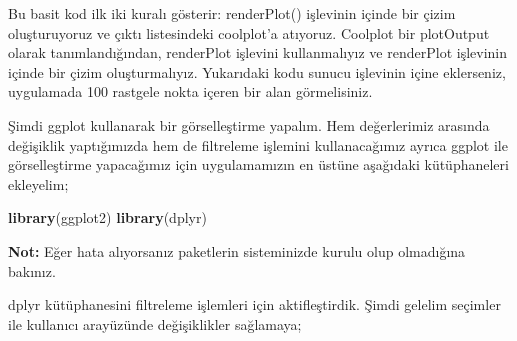 \documentclass[]{book}
\newenvironment{Shaded}{\begin{snugshade}}{\end{snugshade}}
\newcommand{\KeywordTok}[1]{\textcolor[rgb]{0.13,0.29,0.53}{\textbf{#1}}}
\newcommand{\DecValTok}[1]{\textcolor[rgb]{0.00,0.00,0.81}{#1}}
\newcommand{\StringTok}[1]{\textcolor[rgb]{0.31,0.60,0.02}{#1}}
\newcommand{\OperatorTok}[1]{\textcolor[rgb]{0.81,0.36,0.00}{\textbf{#1}}}
\newcommand{\ErrorTok}[1]{\textcolor[rgb]{0.64,0.00,0.00}{\textbf{#1}}}
\newcommand{\NormalTok}[1]{#1}
\begin{document}
Bu basit kod ilk iki kuralı gösterir: renderPlot() işlevinin içinde bir
çizim oluşturuyoruz ve çıktı listesindeki coolplot'a atıyoruz. Coolplot
bir plotOutput olarak tanımlandığından, renderPlot işlevini
kullanmalıyız ve renderPlot işlevinin içinde bir çizim oluşturmalıyız.
Yukarıdaki kodu sunucu işlevinin içine eklerseniz, uygulamada 100
rastgele nokta içeren bir alan görmelisiniz.

Şimdi ggplot kullanarak bir görselleştirme yapalım. Hem değerlerimiz
arasında değişiklik yaptığımızda hem de filtreleme işlemini
kullanacağımız ayrıca ggplot ile görselleştirme yapacağımız için
uygulamamızın en üstüne aşağıdaki kütüphaneleri ekleyelim;

\begin{Shaded}
\begin{Highlighting}[]
\KeywordTok{library}\NormalTok{(ggplot2)}
\KeywordTok{library}\NormalTok{(dplyr)}
\end{Highlighting}
\end{Shaded}

\textbf{Not:} Eğer hata alıyorsanız paketlerin sisteminizde kurulu olup
olmadığına bakınız.

dplyr kütüphanesini filtreleme işlemleri için aktifleştirdik. Şimdi
gelelim seçimler ile kullanıcı arayüzünde değişiklikler sağlamaya;

\begin{Shaded}
\end{Shaded}
\end{document}
